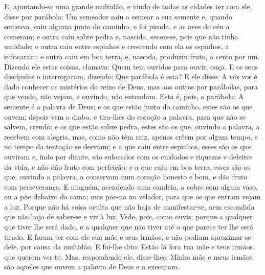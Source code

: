 E, ajuntando-se uma grande multidão, e vindo de todas as cidades
ter com ele, disse por parábola: Um semeador saiu a semear a sua
semente e, quando semeava, caiu alguma junto do caminho, e foi
pisada, e as aves do céu a comeram; e outra caiu sobre pedra e,
nascida, secou-se, pois que não tinha umidade; e outra caiu
entre espinhos e crescendo com ela os espinhos, a sufocaram; e
outra caiu em boa terra, e, nascida, produziu fruto, a cento por um.
Dizendo ele estas coisas, clamava: Quem tem ouvidos para ouvir,
ouça. E os seus discípulos o interrogaram, dizendo: Que parábola
é esta? E ele disse: A vós vos é dado conhecer os mistérios
do reino de Deus, mas aos outros por parábolas, para que vendo, não
vejam, e ouvindo, não entendam. Esta é, pois, a parábola: A
semente é a palavra de Deus; e os que estão junto do caminho,
estes são os que ouvem; depois vem o diabo, e tira-lhes do coração a
palavra, para que não se salvem, crendo; e os que estão sobre
pedra, estes são os que, ouvindo a palavra, a recebem com alegria,
mas, como não têm raiz, apenas crêem por algum tempo, e no tempo da
tentação se desviam; e a que caiu entre espinhos, esses são
os que ouviram e, indo por diante, são sufocados com os cuidados e
riquezas e deleites da vida, e não dão fruto com perfeição; e
a que caiu em boa terra, esses são os que, ouvindo a palavra, a
conservam num coração honesto e bom, e dão fruto com perseverança.
E ninguém, acendendo uma candeia, a cobre com algum vaso, ou
a põe debaixo da cama; mas põe-na no velador, para que os que entram
vejam a luz. Porque não há coisa oculta que não haja de
manifestar-se, nem escondida que não haja de saber-se e vir à luz.
Vede, pois, como ouvis; porque a qualquer que tiver lhe será
dado, e a qualquer que não tiver até o que parece ter lhe será
tirado. E foram ter com ele sua mãe e seus irmãos, e não
podiam aproximar-se dele, por causa da multidão. E foi-lhe
dito: Estão lá fora tua mãe e teus irmãos, que querem ver-te.
Mas, respondendo ele, disse-lhes: Minha mãe e meus irmãos são
aqueles que ouvem a palavra de Deus e a executam.

